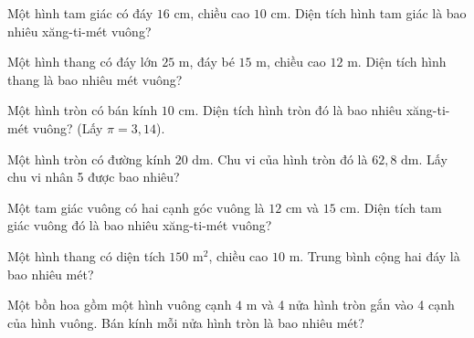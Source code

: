 
\begin{ex}
  Một hình tam giác có đáy $16\text{ cm}$, chiều cao $10\text{ cm}$. Diện tích hình tam giác là bao nhiêu xăng-ti-mét vuông?
\end{ex}

\begin{ex}
  Một hình thang có đáy lớn $25\text{ m}$, đáy bé $15\text{ m}$, chiều cao $12\text{ m}$. Diện tích hình thang là bao nhiêu mét vuông?
\end{ex}

\begin{ex}
  Một hình tròn có bán kính $10\text{ cm}$. Diện tích hình tròn đó là bao nhiêu xăng-ti-mét vuông? (Lấy $\pi = 3{,}14$).
\end{ex}

\begin{ex}
  Một hình tròn có đường kính $20\text{ dm}$. Chu vi của hình tròn đó là $62{,}8\text{ dm}$. Lấy chu vi nhân 5 được bao nhiêu?
\end{ex}

\begin{ex}
  Một tam giác vuông có hai cạnh góc vuông là $12\text{ cm}$ và $15\text{ cm}$. Diện tích tam giác vuông đó là bao nhiêu xăng-ti-mét vuông?
\end{ex}

\begin{ex}
  Một hình thang có diện tích $150\text{ m}^2$, chiều cao $10\text{ m}$. Trung bình cộng hai đáy là bao nhiêu mét?
\end{ex}

\begin{ex}
  Một bồn hoa gồm một hình vuông cạnh $4\text{ m}$ và 4 nửa hình tròn gắn vào 4 cạnh của hình vuông. Bán kính mỗi nửa hình tròn là bao nhiêu mét?
\end{ex}

